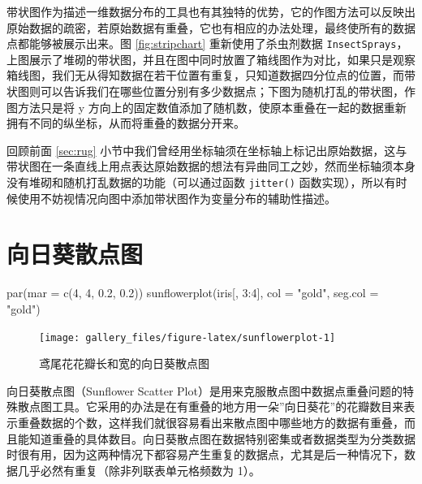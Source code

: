 \documentclass[
  b5paper,
  UTF8,twoside]{book}
\newenvironment{Shaded}{\begin{snugshade}}{\end{snugshade}}
\newcommand{\AttributeTok}[1]{\textcolor[rgb]{0.77,0.63,0.00}{#1}}
\newcommand{\DecValTok}[1]{\textcolor[rgb]{0.00,0.00,0.81}{#1}}
\newcommand{\FloatTok}[1]{\textcolor[rgb]{0.00,0.00,0.81}{#1}}
\newcommand{\FunctionTok}[1]{\textcolor[rgb]{0.00,0.00,0.00}{#1}}
\newcommand{\NormalTok}[1]{#1}
\newcommand{\SpecialCharTok}[1]{\textcolor[rgb]{0.00,0.00,0.00}{#1}}
\newcommand{\StringTok}[1]{\textcolor[rgb]{0.31,0.60,0.02}{#1}}
\begin{document}
带状图作为描述一维数据分布的工具也有其独特的优势，它的作图方法可以反映出原始数据的疏密，若原始数据有重叠，它也有相应的办法处理，最终使所有的数据点都能够被展示出来。图 \ref{fig:stripchart}
重新使用了杀虫剂数据 \texttt{InsectSprays}，上图展示了堆砌的带状图，并且在图中同时放置了箱线图作为对比，如果只是观察箱线图，我们无从得知数据在若干位置有重复，只知道数据四分位点的位置，而带状图则可以告诉我们在哪些位置分别有多少数据点；下图为随机打乱的带状图，作图方法只是将 y 方向上的固定数值添加了随机数，使原本重叠在一起的数据重新拥有不同的纵坐标，从而将重叠的数据分开来。

回顾前面 \ref{sec:rug} 小节中我们曾经用坐标轴须在坐标轴上标记出原始数据，这与带状图在一条直线上用点表达原始数据的想法有异曲同工之妙，然而坐标轴须本身没有堆砌和随机打乱数据的功能（可以通过函数 \texttt{jitter()} 函数实现），所以有时候使用不妨视情况向图中添加带状图作为变量分布的辅助性描述。

\hypertarget{sec:sunflowerplot}{%
\section{向日葵散点图}\label{sec:sunflowerplot}}





\begin{Shaded}
\begin{Highlighting}[]
\FunctionTok{par}\NormalTok{(}\AttributeTok{mar =} \FunctionTok{c}\NormalTok{(}\DecValTok{4}\NormalTok{, }\DecValTok{4}\NormalTok{, }\FloatTok{0.2}\NormalTok{, }\FloatTok{0.2}\NormalTok{))}
\FunctionTok{sunflowerplot}\NormalTok{(iris[, }\DecValTok{3}\SpecialCharTok{:}\DecValTok{4}\NormalTok{], }\AttributeTok{col =} \StringTok{"gold"}\NormalTok{, }\AttributeTok{seg.col =} \StringTok{"gold"}\NormalTok{)}
\end{Highlighting}
\end{Shaded}

\begin{figure}

{\centering \texttt{[image: gallery\_files/figure-latex/sunflowerplot-1]} 

}

\caption[鸢尾花花瓣长和宽的向日葵散点图]{鸢尾花花瓣长和宽的向日葵散点图}\label{fig:sunflowerplot}
\end{figure}

向日葵散点图（Sunflower Scatter Plot）是用来克服散点图中数据点重叠问题的特殊散点图工具。它采用的办法是在有重叠的地方用一朵''向日葵花''的花瓣数目来表示重叠数据的个数，这样我们就很容易看出来散点图中哪些地方的数据有重叠，而且能知道重叠的具体数目。向日葵散点图在数据特别密集或者数据类型为分类数据时很有用，因为这两种情况下都容易产生重复的数据点，尤其是后一种情况下，数据几乎必然有重复（除非列联表单元格频数为 1）。
\end{document}
